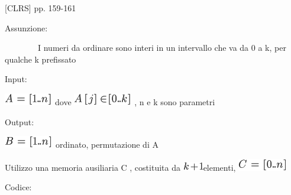 \documentclass{article}
\begin{document}
{{[}CLRS{]} pp. 159-161}

{Assunzione:}

{~~~~~~~~I numeri da ordinare sono interi in un intervallo che va da 0 a
k, per qualche k prefissato}

{Input:}

\includegraphics{images/image182.png}{~dove
}\includegraphics{images/image183.png}{~, n e k sono parametri}

{Output:}

\includegraphics{images/image184.png}{~}{ordinato}{,
permutazione di A}

{Utilizzo una memoria ausiliaria C , costituita da
}\includegraphics{images/image185.png}{elementi,
}\includegraphics{images/image186.png}

{Codice:}



\protect\hypertarget{t.838fe42014bbeb1605fc7de3c1957472acce8e3d}{}{}\protect\hypertarget{t.27}{}{}
\end{document}
